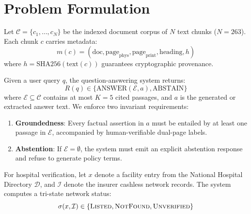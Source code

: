 \documentclass[conference]{IEEEtran}
\begin{document}
\section{Problem Formulation}
Let $\mathcal{C} = \{c_1, \dots, c_N\}$ be the indexed document corpus of $N$ text chunks ($N = 263$). Each chunk $c$ carries metadata:
\begin{equation}
m(c) = (\text{doc}, \text{page}_{\text{phys}}, \text{page}_{\text{print}}, \text{heading}, h)
\end{equation}
where $h = \text{SHA256}(\text{text}(c))$ guarantees cryptographic provenance.

Given a user query $q$, the question-answering system returns:
\begin{equation}
R(q) \in \{\text{ANSWER}(\mathcal{E}, a), \text{ABSTAIN}\}
\end{equation}
where $\mathcal{E} \subseteq \mathcal{C}$ contains at most $K = 5$ cited passages, and $a$ is the generated or extracted answer text. We enforce two invariant requirements:
\begin{enumerate}
    \item \textbf{Groundedness}: Every factual assertion in $a$ must be entailed by at least one passage in $\mathcal{E}$, accompanied by human-verifiable dual-page labels.
    \item \textbf{Abstention}: If $\mathcal{E} = \emptyset$, the system must emit an explicit abstention response and refuse to generate policy terms.
\end{enumerate}

For hospital verification, let $x$ denote a facility entry from the National Hospital Directory $\mathcal{D}$, and $\mathcal{I}$ denote the insurer cashless network records. The system computes a tri-state network status:
\begin{equation}
\sigma(x, \mathcal{I}) \in \{\textsc{Listed}, \textsc{NotFound}, \textsc{Unverified}\}
\end{equation}
\end{document}

